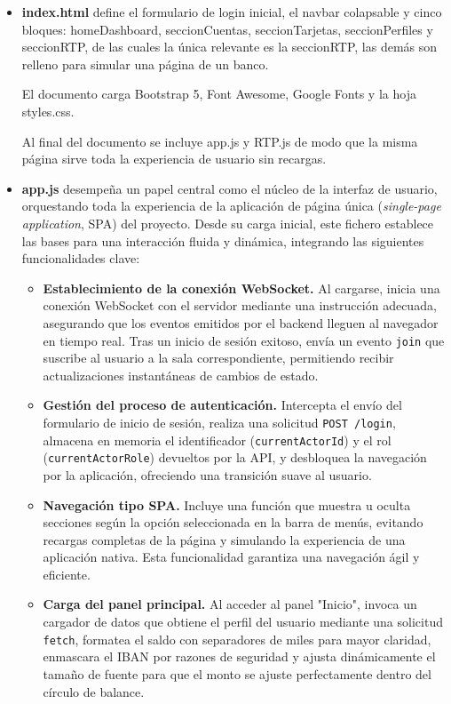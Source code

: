 \begin{itemize}
    \item \textbf{index.html} define el formulario de login inicial, el navbar colapsable y cinco bloques: homeDashboard, seccionCuentas, seccionTarjetas, seccionPerfiles y seccionRTP, de las cuales la única relevante es la seccionRTP, las demás son relleno para simular una página de un banco.
        
    El documento carga Bootstrap 5, Font Awesome, Google Fonts y la hoja styles.css.

    Al final del documento se incluye app.js y RTP.js de modo que la misma página sirve toda la experiencia de usuario sin recargas.
    \item \textbf{app.js} desempeña un papel central como el núcleo de la interfaz de usuario, orquestando toda la experiencia de la aplicación de página única (\textit{single-page application}, SPA) del proyecto. Desde su carga inicial, este fichero establece las bases para una interacción fluida y dinámica, integrando las siguientes funcionalidades clave:
        \begin{itemize}
            \item \textbf{Establecimiento de la conexión WebSocket.} Al cargarse, inicia una conexión WebSocket con el servidor mediante una instrucción adecuada, asegurando que los eventos emitidos por el backend lleguen al navegador en tiempo real. Tras un inicio de sesión exitoso, envía un evento \texttt{join} que suscribe al usuario a la sala correspondiente, permitiendo recibir actualizaciones instantáneas de cambios de estado.

            \item \textbf{Gestión del proceso de autenticación.} Intercepta el envío del formulario de inicio de sesión, realiza una solicitud \texttt{POST /login}, almacena en memoria el identificador (\texttt{currentActorId}) y el rol (\texttt{currentActorRole}) devueltos por la API, y desbloquea la navegación por la aplicación, ofreciendo una transición suave al usuario.

            \item \textbf{Navegación tipo SPA.} Incluye una función que muestra u oculta secciones según la opción seleccionada en la barra de menús, evitando recargas completas de la página y simulando la experiencia de una aplicación nativa. Esta funcionalidad garantiza una navegación ágil y eficiente.

            \item \textbf{Carga del panel principal.} Al acceder al panel "Inicio", invoca un cargador de datos que obtiene el perfil del usuario mediante una solicitud \texttt{fetch}, formatea el saldo con separadores de miles para mayor claridad, enmascara el IBAN por razones de seguridad y ajusta dinámicamente el tamaño de fuente para que el monto se ajuste perfectamente dentro del círculo de balance.


\end{itemize}
\end{itemize}
